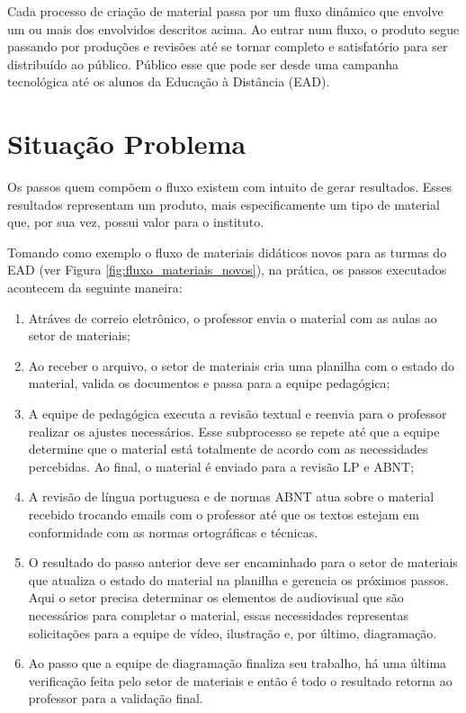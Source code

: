 Cada processo de criação de material passa por um fluxo dinâmico que envolve um ou mais dos envolvidos descritos acima. Ao entrar num fluxo, o produto segue passando por produções e revisões até se tornar completo e satisfatório para ser distribuído ao público. Público esse que pode ser desde uma campanha tecnológica até os alunos da Educação à Distância (EAD).

\section{Situação Problema}

Os passos quem compõem o fluxo existem com intuito de gerar resultados. Esses resultados representam um produto, mais especificamente um tipo de material que, por sua vez, possui valor para o instituto. 

Tomando como exemplo o fluxo de materiais didáticos novos para as turmas do EAD (ver Figura \ref{fig:fluxo_materiais_novos}), na prática, os passos executados acontecem da seguinte maneira:

\begin{enumerate}
  \item Atráves de correio eletrônico, o professor envia o material com as aulas ao setor de materiais;
  \item Ao receber o arquivo, o setor de materiais cria uma planilha com o estado do material, valida os documentos e passa para a equipe pedagógica;
  \item A equipe de pedagógica executa a revisão textual e reenvia para o professor realizar os ajustes necessários. Esse subprocesso se repete até que a equipe determine que o material está totalmente de acordo com as necessidades percebidas. Ao final, o material é enviado para a revisão LP e ABNT;
  \item A revisão de língua portuguesa e de normas ABNT atua sobre o material recebido trocando emails com o professor até que os textos estejam em conformidade com as normas ortográficas e técnicas.
  \item O resultado do passo anterior deve ser encaminhado para o setor de materiais que atualiza o estado do material na planilha e gerencia os próximos passos. Aqui o setor precisa determinar os elementos de audiovisual que são necessários para completar o material, essas necessidades representas solicitações para a equipe de vídeo, ilustração e, por último, diagramação. 
  \item Ao passo que a equipe de diagramação finaliza seu trabalho, há uma última verificação feita pelo setor de materiais e então é todo o resultado retorna ao professor para a validação final.
\end{enumerate}

